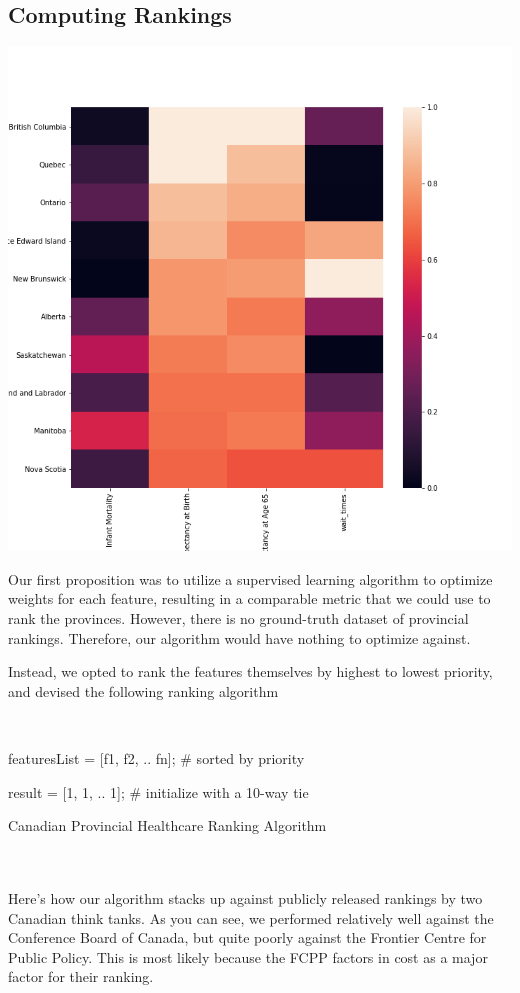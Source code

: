 \documentclass[preprint,12pt]{elsarticle}
\begin{document}
\subsection{Computing Rankings}
\includegraphics[scale=0.5]{heatmap_rank.png}

Our first proposition was to utilize a supervised learning algorithm to optimize weights for each feature, resulting in a comparable metric that we could use to rank the provinces. However, there is no ground-truth dataset of provincial rankings. Therefore, our algorithm would have nothing to optimize against. 

Instead, we opted to rank the features themselves by highest to lowest priority, and devised the following ranking algorithm

\\
\begin{algorithm}[H]
\SetAlgoLined
{}
 featuresList = [f1, f2, .. fn]; \# sorted by priority

 result = [1, 1, .. 1]; \# initialize with a 10-way tie
 
 \caption{Canadian Provincial Healthcare Ranking Algorithm}
\end{algorithm}
\\ \\
Here's how our algorithm stacks up against publicly released rankings by two Canadian think tanks. As you can see, we performed relatively well against the Conference Board of Canada, but quite poorly against the Frontier Centre for Public Policy. This is most likely because the FCPP factors in cost as a major factor for their ranking.
\end{document}
